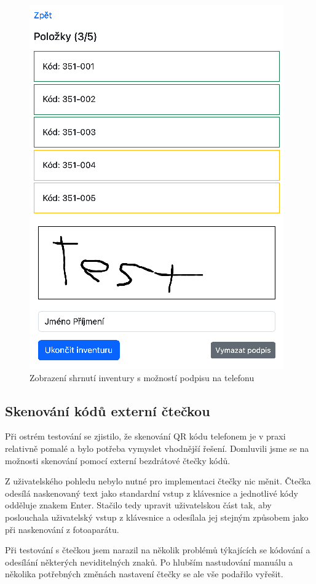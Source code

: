 \begin{figure}
    \centering
    \includegraphics[width=0.5\linewidth]{interaktivni-inventura-podpis.png}
    \caption{Zobrazení shrnutí inventury s možností podpisu na telefonu}
    \label{fig:enter-label}
\end{figure}


\subsection{Skenování kódů externí čtečkou}

Při ostrém testování se zjistilo, že skenování QR kódu telefonem je v praxi relativně pomalé a bylo potřeba vymyslet vhodnější řešení. Domluvili jsme se na možnosti skenování pomocí externí bezdrátové čtečky kódů.

Z uživatelského pohledu nebylo nutné pro implementaci čtečky nic měnit. Čtečka odesílá naskenovaný text jako standardní vstup z klávesnice a jednotlivé kódy odděluje znakem Enter. Stačilo tedy upravit uživatelskou část tak, aby poslouchala uživatelský vstup z klávesnice a odesílala jej stejným způsobem jako při naskenování z fotoaparátu.

Při testování s čtečkou jsem narazil na několik problémů týkajících se kódování a odesílání některých neviditelných znaků. Po hlubším nastudování manuálu a několika potřebných změnách nastavení čtečky se ale vše podařilo vyřešit.

